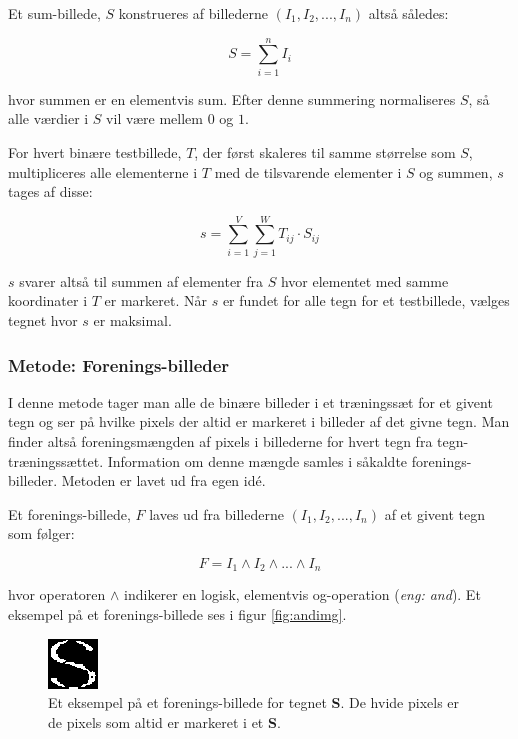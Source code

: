 Et sum-billede, $S$ konstrueres af billederne $(I_{1},I_{2},...,I_{n})$ altså således:

\begin{displaymath}
	S = \sum_{i=1}^n{I_i}
\end{displaymath}

hvor summen er en elementvis sum. Efter denne summering normaliseres $S$, så alle værdier i $S$ vil være mellem $0$ og $1$.

For hvert binære testbillede, $T$, der først skaleres til samme størrelse som $S$, multipliceres alle elementerne i $T$ med de tilsvarende elementer i $S$ og summen, $s$ tages af disse:

\begin{displaymath}
	s = \sum_{i=1}^V{\sum_{j=1}^W{T_{ij} \cdot S_{ij}}}
\end{displaymath}

$s$ svarer altså til summen af elementer fra $S$ hvor elementet med samme koordinater i $T$ er markeret. Når $s$ er fundet for alle tegn for et testbillede, vælges tegnet hvor $s$ er maksimal.

\subsubsection*{Metode: Forenings-billeder}

I denne metode tager man alle de binære billeder i et træningssæt for et givent tegn og ser på hvilke pixels der altid er markeret i billeder af det givne tegn. Man finder altså foreningsmængden af pixels i billederne for hvert tegn fra tegn-træningssættet. Information om denne mængde samles i såkaldte forenings-billeder. Metoden er lavet ud fra egen idé.

Et forenings-billede, $F$ laves ud fra billederne $(I_{1},I_{2},...,I_{n})$ af et givent tegn som følger:

\begin{displaymath}
F = I_1 \wedge I_2 \wedge ... \wedge I_n
\end{displaymath}

hvor operatoren $\wedge$ indikerer en logisk, elementvis og-operation (\textit{eng: and}). Et eksempel på et forenings-billede ses i figur \vref{fig:andimg}.

\begin{figure}[htp]
\centering
\includegraphics{system/illu/andimg.png} 
\caption{Et eksempel på et forenings-billede for tegnet \textbf{S}. De hvide pixels er de pixels som altid er markeret i et \textbf{S}.}
\label{fig:andimg}
\end{figure}


